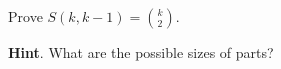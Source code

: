 \documentclass{book}
\begin{document}
\setcounter{cpjt}{273}
\addtocounter{cpjt}{-1}
\begin{activity}\label{activity-266}
\hypertarget{p-1397}{}%
Prove \(S(k, k-1) = \binom{k}{2}\).%
\par\smallskip%
\noindent\textbf{Hint}.\hypertarget{hint-176}{}\quad%
\hypertarget{p-1398}{}%
What are the possible sizes of parts?%
\par\smallskip%
\noindent\end{activity}

\clearpage
\end{document}
